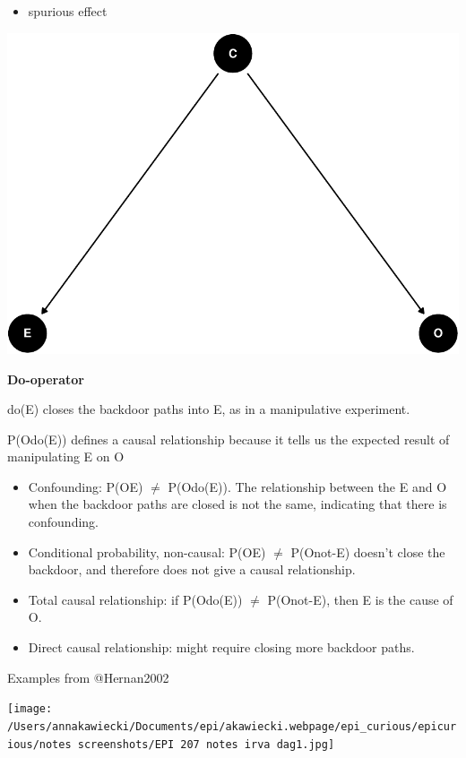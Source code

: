 \documentclass[
]{article}
\providecommand{\tightlist}{%
  \setlength{\itemsep}{0pt}\setlength{\parskip}{0pt}}
\begin{document}
\begin{itemize}
\tightlist
\item
  spurious effect
\end{itemize}

\includegraphics{index_files/figure-latex/dag2 ex1-1.pdf}

\textbf{Do-operator}

do(E) closes the backdoor paths into E, as in a manipulative experiment.

P(O\textbar do(E)) defines a causal relationship because it tells us the
expected result of manipulating E on O

\begin{itemize}
\item
  Confounding: P(O\textbar E) \(\ne\) P(O\textbar do(E)). The
  relationship between the E and O when the backdoor paths are closed is
  not the same, indicating that there is confounding.
\item
  Conditional probability, non-causal: P(O\textbar E) \(\ne\)
  P(O\textbar not-E) doesn't close the backdoor, and therefore does not
  give a causal relationship.
\item
  Total causal relationship: if P(O\textbar do(E)) \(\ne\)
  P(O\textbar not-E), then E is the cause of O.
\item
  Direct causal relationship: might require closing more backdoor paths.
\end{itemize}

Examples from @Hernan2002

\texttt{[image: /Users/annakawiecki/Documents/epi/akawiecki.webpage/epi\_curious/epicurious/notes screenshots/EPI 207 notes irva dag1.jpg]}
\end{document}
